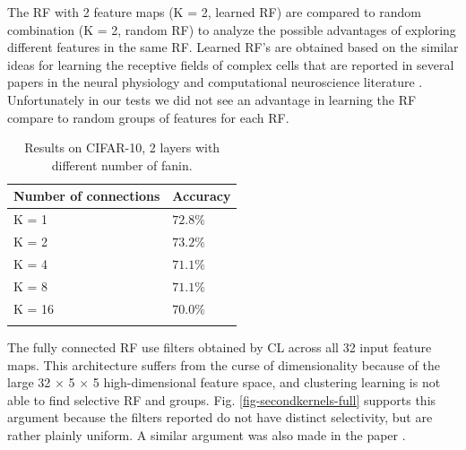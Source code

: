\documentclass{article} %
\begin{document}
The RF with 2 feature maps (K = 2, learned RF) are compared to random combination (K = 2, random RF) to analyze the possible advantages of exploring different features in the same RF. Learned RF's are obtained  based on the similar ideas for learning the receptive fields of complex cells that are reported in  several papers in the neural physiology and computational neuroscience literature \cite{masquelier2007learning,spratling2005learning,wiskott2002slow,wallis1997invariant}.
Unfortunately in our tests we did not see an advantage in learning the RF compare to random groups of features for each RF.

\setlength{\tabcolsep}{10pt}

\begin{table}
\caption{Results on CIFAR-10, 2 layers with different number of fanin.}
\begin{centering}
\begin{tabular}{ll}
\multicolumn{1}{c}{\bf Number of connections}  &\multicolumn{1}{c}{\bf Accuracy}\\
\hline
K = 1		&$72.8\%$\\
K = 2		&$73.2\%$\\
K = 4		&$71.1\%$\\
K = 8		&$71.1\%$\\
K = 16		&$70.0\%$\\
\hline
\label{tab:fanin}
\end{tabular}
\par %
\end{centering}

\end{table}

The fully connected RF use filters obtained by CL across all 32 input feature maps. This architecture suffers from the curse of dimensionality because of the large 32 $\times$ 5 $\times$ 5 high-dimensional feature space, and clustering learning is not able to find selective RF and groups.
Fig. \ref{fig-secondkernels-full} supports this argument because the filters reported do not have distinct selectivity, but are rather plainly uniform. A similar argument was also made in the paper \cite{coates2012learning}.
\end{document}

